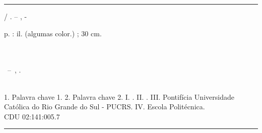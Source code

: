 \documentclass[
	12pt,		%
    openright, 	%
    oneside,	%
    a4paper,	%
	french,				%
	spanish,			%
	english,				%
    brazil,				%
]{abntex2}
\newcommand{\imprimirescola}{Escola Politécnica}
\newcommand{\imprimiruniversidade}{Pontifícia Universidade Católica do Rio Grande do Sul - PUCRS}
\begin{document}
 \begin{fichacatalografica}
 	\vspace*{\fill}					%
 	\hrule							%
 	\begin{center}					%
 	\begin{minipage}[c]{12.5cm}		%
	
 	\imprimirautor
	
 	\hspace{0.5cm} \imprimirtitulo  / \imprimirautor. --
 	\imprimirlocal, \imprimirdata-
	
 	\hspace{0.5cm} \pageref{LastPage} p. : il. (algumas color.) ; 30 cm.\\
	
 	\hspace{0.5cm} \imprimirorientadorRotulo~\imprimirorientador\\
 	\hspace{0.5cm} \imprimircoorientadorRotulo~\imprimircoorientador\\
	
 	\hspace{0.5cm}
 	\parbox[t]{\textwidth}{\imprimirtipotrabalho~--~\imprimirinstituicao,
 	\imprimirdata.}\\
	
 	\hspace{0.5cm}
 		1. Palavra chave 1.
 		2. Palavra chave 2.
 		I. \imprimirorientador.
 		II. \imprimircoorientador.
 		III. \imprimiruniversidade.
 		IV. \imprimirescola. \\	
	
 	\hspace{8.75cm} CDU 02:141:005.7\\
	
 	\end{minipage}
 	\end{center}
 	\hrule
 \end{fichacatalografica}

%
%
%
%
\end{document}

